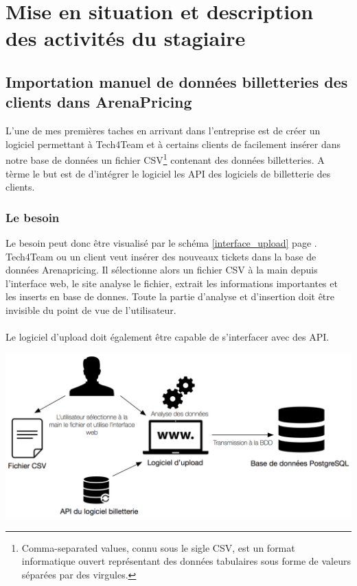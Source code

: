 \chapter{Mise en situation et description des activités du stagiaire}


\section{Importation manuel de données billetteries des clients dans ArenaPricing}

L'une de mes premières taches en arrivant dans l'entreprise est de créer un logiciel permettant à Tech4Team et à certains clients de facilement insérer dans notre base de données un fichier CSV\footnote{Comma-separated values, connu sous le sigle CSV, est un format informatique ouvert représentant des données tabulaires sous forme de valeurs séparées par des virgules.} contenant des données billetteries. A tèrme le but est de d'intégrer le logiciel les API des logiciels de billetterie des clients.

\subsection{Le besoin}

Le besoin peut donc être visualisé par le schéma \ref{interface_upload} page \pageref{interface_upload}. Tech4Team ou un client veut insérer des nouveaux tickets dans la base de données Arenapricing. Il sélectionne alors un fichier CSV à la main depuis l'interface web, le site analyse le fichier, extrait les informations importantes et les inserts en base de donnes. Toute la partie d'analyse et d'insertion doit être invisible du point de vue de l'utilisateur.
\\ \\
Le logiciel d'upload doit également être capable de s'interfacer avec des API.

\begin{center}
\includegraphics[scale=0.6]{images/datafit.png}
\label{interface_upload}
\end{center}


